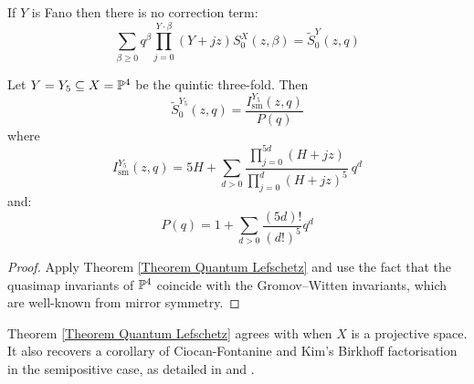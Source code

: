 \begin{cor}
 If $Y$ is Fano then there is no correction term:
\begin{equation*} \sum_{\beta\geq 0} q^\beta\prod_{j=0}^{Y\cdot\beta}(Y+jz)S_0^X(z,\beta) = \tilde{S}_0^Y(z,q) \end{equation*}
\end{cor}

\begin{cor}
Let $Y = Y_5 \subseteq  X = \mathbb P^4$ be the quintic three-fold. Then
\begin{equation*} \tilde{S}_0^{Y_5}(z,q)=\dfrac{I_{\text{sm}}^{Y_5}(z,q)}{P(q)} \end{equation*}
where
\begin{equation*} I_{\text{sm}}^{Y_5}(z,q)=5H+\sum_{d>0}\frac{\prod_{j=0}^{5d}(H+jz)}{\prod_{j=0}^{d}(H+jz)^5} \ q^d \end{equation*}
and:
\begin{equation*} P(q)=1+\sum_{d>0}\frac{(5d)!}{(d!)^5}q^d \end{equation*}
\end{cor}
\begin{proof} Apply Theorem \ref{Theorem Quantum Lefschetz} and use the fact that the quasimap invariants of $\mathbb P^4$ coincide with the Gromov--Witten invariants, which are well-known from mirror symmetry. \end{proof}

\begin{rmk}
Theorem \ref{Theorem Quantum Lefschetz} agrees with \cite[Theorem~1]{CZ-mirror} when $X$ is a projective space. It also recovers a corollary of Ciocan-Fontanine and Kim's Birkhoff factorisation in the semipositive case, as detailed in \cite[\S 5.5]{CF-K-wallcrossing} and \cite[\S 5.6]{BN}.
\end{rmk}

